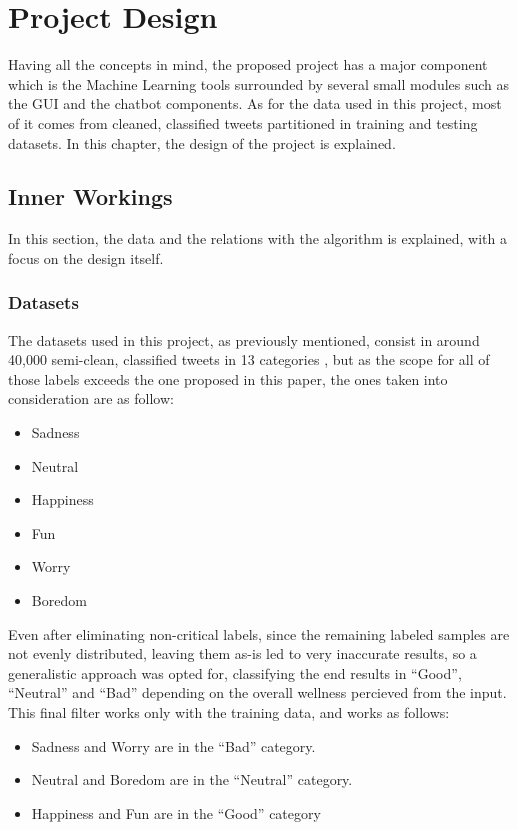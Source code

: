 \chapter{Project Design}
Having all the concepts in mind, the proposed project has a major component which is the Machine Learning tools surrounded by several small modules such as the GUI and the chatbot components.
As for the data used in this project, most of it comes from cleaned, classified tweets partitioned in training and testing datasets.
In this chapter, the design of the project is explained.

\section{Inner Workings}
In this section, the data and the relations with the algorithm is explained, with a focus on the design itself.
\subsection{Datasets}
The datasets used in this project, as previously mentioned, consist in around 40,000 semi-clean, classified tweets in 13 categories \citep{rf20}, but as the scope for all of those labels exceeds the one proposed in this paper, the ones taken into consideration are as follow:
\begin{itemize}
	\item Sadness
	\item Neutral
	\item Happiness
	\item Fun
	\item Worry
	\item Boredom
\end{itemize}
Even after eliminating non-critical labels, since the remaining  labeled samples are not evenly distributed, leaving them as-is led to very inaccurate results, so a generalistic approach was opted for, classifying the end results in ``Good'', ``Neutral'' and ``Bad'' depending on the overall wellness percieved from the input.
This final filter works only with the training data, and works as follows:
\begin{itemize}
	\item Sadness and Worry are in the ``Bad'' category.
	\item Neutral and Boredom are in the ``Neutral'' category.
	\item Happiness and Fun are in the ``Good'' category
\end{itemize}

